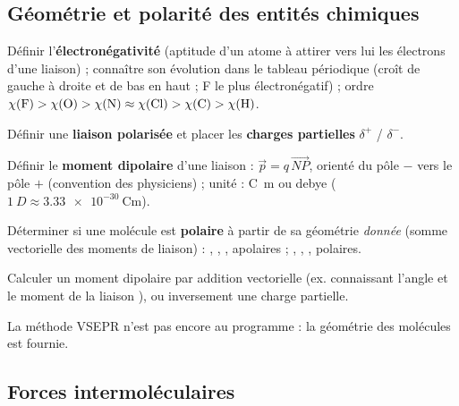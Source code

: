 \documentclass[11pt,a4paper]{article}
\begin{document}
\subsection{Géométrie et polarité des entités chimiques}

\begin{savoir}
  \item Définir l'\textbf{électronégativité} (aptitude d'un atome à attirer vers lui les électrons
        d'une liaison) ; connaître son évolution dans le tableau périodique
        (croît de gauche à droite et de bas en haut ; F le plus électronégatif) ;
        ordre $\chi(\ce{F})>\chi(\ce{O})>\chi(\ce{N})\approx\chi(\ce{Cl})>\chi(\ce{C})>\chi(\ce{H})$.
  \item Définir une \textbf{liaison polarisée} et placer les \textbf{charges partielles} $\delta^+$ / $\delta^-$.
  \item Définir le \textbf{moment dipolaire} d'une liaison : $\vec{p} = q\,\overrightarrow{NP}$,
        orienté du pôle $-$ vers le pôle $+$ (convention des physiciens) ; unité :
        \si{\coulomb\metre} ou debye ($\SI{1}{D}\approx\SI{3.33e-30}{\coulomb\metre}$).
  \item Déterminer si une molécule est \textbf{polaire} à partir de sa géométrie \emph{donnée}
        (somme vectorielle des moments de liaison) : , , , 
        apolaires ; , , ,  polaires.
  \item Calculer un moment dipolaire par addition vectorielle (ex.  connaissant l'angle
        et le moment de la liaison ), ou inversement une charge partielle.
\end{savoir}

\begin{horsprog}
La méthode VSEPR n'est pas encore au programme : la géométrie des molécules est fournie.
\end{horsprog}

\subsection{Forces intermoléculaires}
\end{document}
